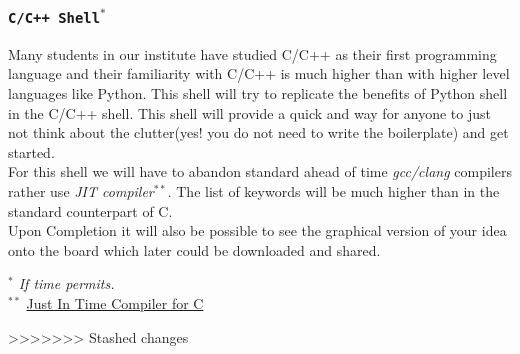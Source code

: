 \documentclass[letterpaper,10pt]{article}
\begin{document}
  		\subsubsection{\texttt{C/C++ Shell$^{*}$}}
  		Many students in our institute have studied C/C++ as their first programming language and their familiarity with C/C++ is much higher than with higher level languages like Python. This shell will try to replicate the benefits of Python shell in the C/C++ shell. This shell will provide a quick and way for anyone to just not think about the clutter(yes! you do not need to write the boilerplate) and get started.\\For this shell we will have to abandon standard  ahead of time \emph{gcc/clang} compilers rather use \emph{JIT compiler$^{**}$}. The list of keywords will be much higher than in the standard counterpart of C.\\Upon Completion it will also be possible to see the graphical version of your idea onto the board which later could be downloaded and shared.
  		\begin{footnotesize}
  		\begin{flushright}
  		\textit{$^{*}$ If time permits.\\}
  		$^{**}$ \href{https://github.com/vnmakarov/mir}{Just In Time Compiler for C}
  		\end{flushright}
  		\end{footnotesize}
		\hline
>>>>>>> Stashed changes
\end{document}
